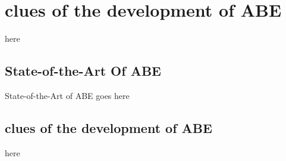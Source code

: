 \section{clues of the development of ABE}

here

\subsection{State-of-the-Art Of ABE}
State-of-the-Art of ABE goes here

\subsection{clues of the development of ABE} 
here 